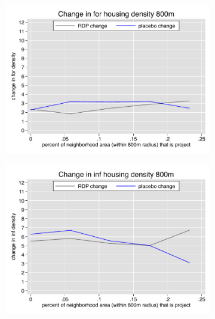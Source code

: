 \documentclass[12pt]{article}
\begin{document}
\begin{figure}
        \vspace{-6mm}
        \begin{subfigure}[b]{0.495\textwidth}
            \centering
            \includegraphics[width=\textwidth,trim={0.3cm .3cm 0.1cm 0cm}, clip=true]{figures/change_for_800_total.pdf}
        \end{subfigure}
        \hfill
        \begin{subfigure}[b]{0.495\textwidth}  
            \centering 
            \includegraphics[width=\textwidth,trim={0.3cm .3cm 0.1cm 0cm}, clip=true]{figures/change_inf_800_total.pdf}
        \end{subfigure}
        \vspace{-6mm}
    \end{figure} 
\end{document}
